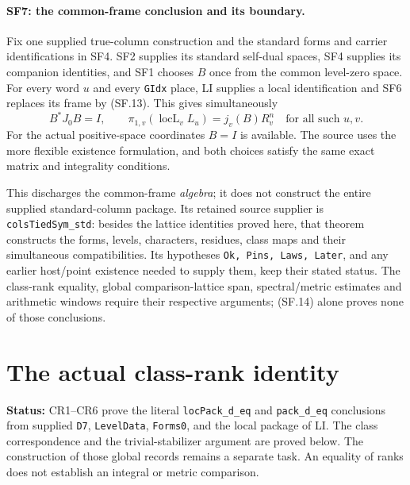 \documentclass[11pt,a4paper]{article}
\numberwithin{equation}{section}
\theoremstyle{remark}\newtheorem{remark}[theorem]{Remark}
\newcommand{\status}[1]{\textbf{Status:} #1}
\begin{document}
\paragraph{SF7: the common-frame conclusion and its boundary.}
Fix one supplied true-column construction and the standard forms and
carrier identifications in SF4. SF2 supplies its standard self-dual
spaces, SF4 supplies its companion identities, and SF1 chooses $B$
once from the common level-zero space. For every word $u$ and every
\texttt{GIdx} place, LI supplies a local identification and SF6 replaces
its frame by (SF.13). This gives simultaneously
\[
 B^*J_0B=I,\qquad
 \pi_{1,v}(\operatorname{locL}_v L_u)=j_v(B)R_v^n
 \quad\text{for all such }u,v.                          \tag{SF.14}
\]
For the actual positive-space coordinates $B=I$ is available. The source
uses the more flexible existence formulation, and both choices satisfy
the same exact matrix and integrality conditions.

This discharges the common-frame \emph{algebra}; it does not construct
the entire supplied standard-column package. Its retained source supplier
is \texttt{colsTiedSym\_std}: besides the lattice identities proved here,
that theorem constructs the forms, levels, characters, residues, class
maps and their simultaneous compatibilities. Its hypotheses
\texttt{Ok, Pins, Laws, Later}, and any earlier host/point existence
needed to supply them, keep their stated status. The class-rank equality,
global comparison-lattice span, spectral/metric estimates and arithmetic
windows require their respective arguments; (SF.14) alone proves none
of those conclusions.


\section{The actual class-rank identity}
\label{sec:class-rank}

\status{CR1--CR6 prove the literal \texttt{locPack\_d\_eq} and
\texttt{pack\_d\_eq} conclusions from supplied \texttt{D7},
\texttt{LevelData}, \texttt{Forms0}, and the local package of LI.
The class correspondence and the trivial-stabilizer argument are proved
below. The construction of those global records remains a separate task.
An equality of ranks does not establish an integral or metric comparison.}
\end{document}
